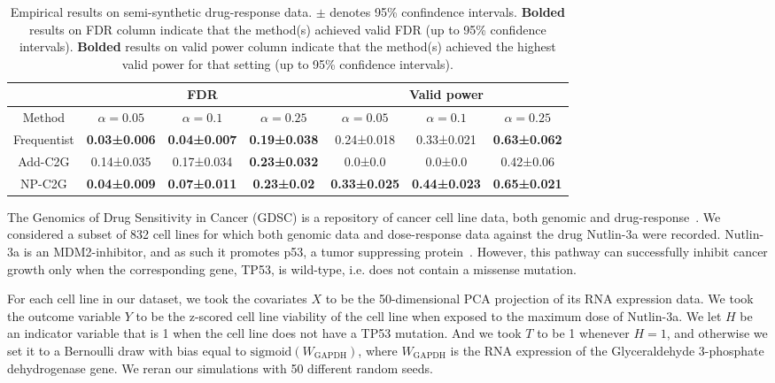 
\begin{table}
\centering
\caption{Empirical results on semi-synthetic drug-response data. $\pm$ denotes 95\% confindence intervals. \textbf{Bolded} results on FDR column indicate that the method(s) achieved valid FDR (up to 95\% confidence intervals). \textbf{Bolded} results on valid power column indicate that the method(s) achieved the highest valid power for that setting (up to 95\% confidence intervals).}
\begin{tabular}{||c|c|c|c|c|c|c||}
\hline
& \multicolumn{3}{|c|}{FDR} & \multicolumn{3}{|c|}{Valid power} \\
\hline
Method & $\alpha=0.05$ & $\alpha=0.1$ & $\alpha=0.25$ & $\alpha=0.05$ & $\alpha=0.1$ & $\alpha=0.25$ \\
\hline
Frequentist & \textbf{ 0.03±0.006 } & \textbf{ 0.04±0.007 } & \textbf{ 0.19±0.038 } & 0.24±0.018 & 0.33±0.021 & \textbf{ 0.63±0.062 } \\
Add-C2G & 0.14±0.035 & 0.17±0.034 & \textbf{ 0.23±0.032 } & 0.0±0.0 & 0.0±0.0 & 0.42±0.06 \\
NP-C2G & \textbf{ 0.04±0.009 } & \textbf{ 0.07±0.011 } & \textbf{ 0.23±0.02 } & \textbf{ 0.33±0.025 } & \textbf{ 0.44±0.023 } & \textbf{ 0.65±0.021 } \\
\hline
\end{tabular}
\label{table:nutlin-simulations}
\end{table}
The Genomics of Drug Sensitivity in Cancer (GDSC) is a repository of cancer cell line data, both genomic and drug-response~\cite{iorio:etal:2016:gdsc-interactions,yang:etal:2013:gdsc}. We considered a subset of 832 cell lines for which both genomic data and dose-response data against the drug Nutlin-3a were recorded. Nutlin-3a is an MDM2-inhibitor, and as such it promotes p53, a tumor suppressing protein~\cite{shen:maki:2011:p53}. However, this pathway can successfully inhibit cancer growth only when the corresponding gene, TP53, is wild-type, i.e. does not contain a missense mutation.

For each cell line in our dataset, we took the covariates $X$ to be the 50-dimensional PCA projection of its RNA expression data. We took the outcome variable $Y$ to be the z-scored cell line viability of the cell line when exposed to the maximum dose of Nutlin-3a. We let $H$ be an indicator variable that is 1 when the cell line does not have a TP53 mutation. And we took $T$ to be 1 whenever $H=1$, and otherwise we set it to a Bernoulli draw with bias equal to $\text{sigmoid}(W_{\text{GAPDH}})$, where $W_{\text{GAPDH}}$ is the RNA expression of the Glyceraldehyde 3-phosphate dehydrogenase gene. We reran our simulations with 50 different random seeds.

